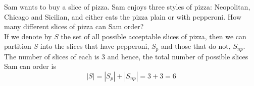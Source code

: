 \documentclass[handout]{ximera}
\begin{document}
\begin{example}[example 3]
Sam wants to buy a slice of pizza.  
Sam enjoys three styles of pizza: Neopolitan, Chicago and Sicilian, 
and either eats the pizza plain or with pepperoni.  
How many different slices of pizza can Sam order?\\
If we denote by $S$ the set of all possible acceptable slices of pizza, 
then we can partition $S$ into the slices that have pepperoni, $S_p$ and 
those that do not, $S_{np}$. The number of slices of each is 3 and 
hence, the total number of possible slices Sam can order is
\[
|S| = |S_p| + |S_{np}| = 3+3 =6
\]
\end{example}
\end{document}
